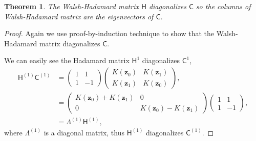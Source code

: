 \documentclass{iitthesis}          %
\newcommand{\bm}[1]{\boldsymbol{#1}}
\newcommand{\vz}{\bm{z}}
\newcommand{\mC}{\mathsf{C}}
\newcommand{\mH}{\mathsf{H}}
\newtheorem{theorem}{Theorem}[section]
\begin{document}
\begin{theorem}
	\label{thrm:hadamard_eigenvector}
The Walsh-Hadamard matrix $\mH$ diagonalizes $\mC$ so the columns of Walsh-Hadamard matrix are the eigenvectors of $\mC$.
\end{theorem}

\begin{proof}
	
Again we use proof-by-induction technique to show that the Walsh-Hadamard matrix diagonalizes $\mC$.

We can easily see the Hadamard matrix $\mH^{1}$ diagonalizes $\mC^{1}$,
\begin{align*}
\mH^{(1)} \mC^{(1)} &= 
\begin{pmatrix}
1 & 1 \\ 1 & -1
\end{pmatrix}
\begin{pmatrix}
K(\vz_{0}) & K(\vz_{1}) \\ K(\vz_{1}) & K(\vz_{0})
\end{pmatrix},
\\
& = 
\begin{pmatrix}
K(\vz_{0})+K(\vz_{1}) & 0 \\ 0 & K(\vz_{0})-K(\vz_{1})
\end{pmatrix}
\begin{pmatrix}
1 & 1 \\ 1 & -1
\end{pmatrix},
\\ 
&= \Lambda^{(1)} \mH^{(1)},
\end{align*}
where $\Lambda^{(1)}$ is a diagonal matrix, thus $\mH^{(1)}$ diagonalizes $\mC^{(1)}$.


\end{proof}
\end{document}
